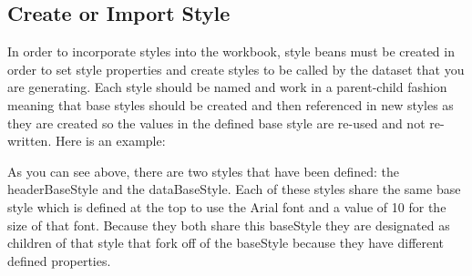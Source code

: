 \documentclass[letterpaper,10pt]{article}
\begin{document}
\subsection{Create or Import Style}
In order to incorporate styles into the workbook, style beans must be created in order to set style properties and create styles to be called by the dataset that you are generating.  Each style should be named and work in a parent-child fashion meaning that base styles should be created and then referenced in new styles as they are created so the values in the defined base style are re-used and not re-written.  Here is an example:
As you can see above, there are two styles that have been defined: the headerBaseStyle and the dataBaseStyle.  Each of these styles share the same base style which is defined at the top to use the Arial font and a value of 10 for the size of that font.  Because they both share this baseStyle they are designated as children of that style that fork off of the baseStyle because they have different defined properties.
\end{document}
